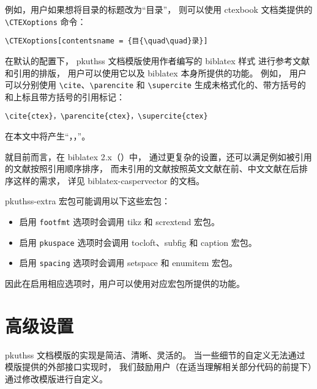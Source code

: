 例如，用户如果想将目录的标题改为“目{\quad\quad}录”，
则可以使用 ctexbook 文档类提供的 \verb|\CTEXoptions| 命令：
\begin{Verbatim}[frame = single]
\CTEXoptions[contentsname = {目{\quad\quad}录}]
\end{Verbatim}

在默认的配置下，%
pkuthss 文档模版使用作者编写的 biblatex\supercite{biblatex} 样式%
\mbox{\supercite{biblatex-caspervector}}%
进行参考文献和引用的排版，
用户可以使用它以及 biblatex 本身所提供的功能。
例如，
用户可以分别使用 \verb|\cite|、\verb|\parencite| 和 \verb|\supercite|
生成未格式化的、带方括号的和上标且带方括号的引用标记：
\begin{Verbatim}[frame = single]
\cite{ctex}，\parencite{ctex}，\supercite{ctex}
\end{Verbatim}
在本文中将产生“\cite{ctex}，\parencite{ctex}，\supercite{ctex}”。

就目前而言，在 biblatex 2.x（）中，
通过更复杂的设置，还可以满足例如被引用的文献按照引用顺序排序，
而未引用的文献按照英文文献在前、中文文献在后排序这样的需求，
详见 biblatex-caspervector 的文档\supercite{biblatex-caspervector}。

pkuthss-extra 宏包可能调用以下这些宏包：
\begin{itemize}
	\item 启用 \verb|footfmt| 选项时会调用
		tikz\supercite{tikz} 和 scrextend\supercite{scrextend} 宏包。
	\item 启用 \verb|pkuspace| 选项时会调用
		tocloft\supercite{tocloft}、subfig\supercite{subfig} 和
		caption\supercite{caption} 宏包。
	\item 启用 \verb|spacing| 选项时会调用 setspace 和
		enumitem\supercite{enumitem} 宏包。
\end{itemize}
因此在启用相应选项时，用户可以使用对应宏包所提供的功能。

\section{高级设置}\label{sec:advanced}

pkuthss 文档模版的实现是简洁、清晰、灵活的。
当一些细节的自定义无法通过模版提供的外部接口实现时，
我们鼓励用户（在适当理解相关部分代码的前提下）通过修改模版进行自定义。

